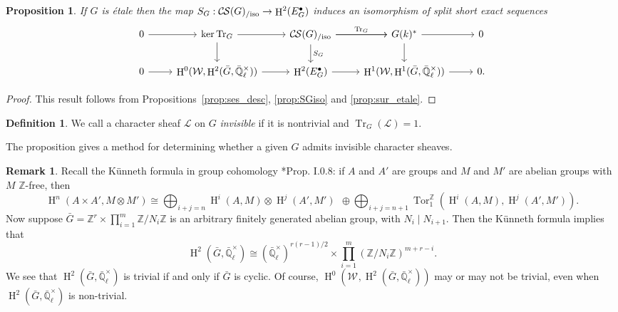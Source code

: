 \documentclass[10pt]{amsart}
\theoremstyle{plain}
\newtheorem{proposition}[theorem]{Proposition}
\theoremstyle{definition}
\newtheorem{definition}[theorem]{Definition}
\newtheorem{remark}[theorem]{Remark}
\newcommand{\ZZ}{{\mathbb{Z}}}
\newcommand{\EE}{\mathbb{\bar Q}_\ell}
\newcommand{\Fq}{k}
\newcommand{\EEx}{\EE^\times}
\newcommand{\Weil}[1]{\mathcal{W}_{#1}}
\DeclareMathOperator{\Hh}{H}
\DeclareMathOperator{\Tor}{Tor}
\newcommand{\TrFrob}[1]{\operatorname{Tr}_{#1}}
\newcommand{\cs}[1]{{\mathcal{#1}}}
\newcommand{\CS}{{\mathcal{C\hskip-0.8pt S}}}
\newcommand{\CSiso}[1]{\CS(#1)_{/\text{iso}}}
\newcommand{\bG}{\bar{G}}
\begin{document}
\begin{proposition} \label{prop:etale-iso}
 If $G$ is \'etale then the map $S_G : \CSiso{G}\to \Hh^2(E^\bullet_G)$ induces an isomorphism of split short exact sequences
\[
\begin{tikzcd}
 0 \arrow{r} & \ker \TrFrob{G} \arrow{d} \arrow{r} & \CSiso{G}\arrow{d}{S_G} \arrow{r}{\TrFrob{G}} \arrow{r} & G(\Fq)^* \arrow{d} \arrow{r} & 0\\
  0 \arrow{r} & \Hh^0(\Weil{},\Hh^2(\bG,\EEx)) \arrow{r} & \Hh^2(E^\bullet_G) \arrow{r} & \Hh^1(\Weil{},\Hh^1(\bG,\EEx)) \arrow{r} & 0.
 \end{tikzcd}
 \]
\end{proposition}
\begin{proof}
This result follows from Propositions~\ref{prop:ses_desc}, \ref{prop:SGiso} and \ref{prop:sur_etale}.
\end{proof}

\begin{definition}
We call a character sheaf $\cs{L}$ on $G$ \emph{invisible} if it is nontrivial and $\TrFrob{G}(\cs{L}) = 1$.
\end{definition}

The proposition gives a method for determining whether a given $G$ admits invisible character sheaves.

\begin{remark} \label{rem:H2}
Recall the K\"unneth formula in group cohomology \cite{brown:CohomologyGrps}*{Prop. I.0.8}:
if $A$ and $A'$ are groups and $M$ and $M'$ are abelian groups with $M$ $\ZZ$-free, then
\[
\Hh^n(A \times A', M \otimes M') \cong \bigoplus_{i+j=n} \Hh^i(A, M) \otimes \Hh^j(A', M') \ \ \oplus
\bigoplus_{i+j=n+1} \Tor_1^{\ZZ}\left(\Hh^i(A, M), \Hh^j(A', M')\right).
\]
%
Now suppose $\bG = \ZZ^r \times \prod_{i = 1}^m \ZZ/N_i\ZZ$ is an arbitrary finitely generated abelian group,
with $N_i \mid N_{i+1}$.  Then the K\"unneth formula implies that
\begin{equation} \label{eq:H2comp}
\Hh^2(\bG, \EEx) \cong \left(\EEx\right)^{r(r-1)/2} \times \prod_{i=1}^m (\ZZ/N_i\ZZ)^{m+r-i}.
\end{equation}
We see that $\Hh^2(\bG, \EEx)$ is trivial if and only if $\bG$ is cyclic.  Of course, $\Hh^0(\Weil{}, \Hh^2(\bG, \EEx))$
may or may not be trivial, even when $\Hh^2(\bG, \EEx)$ is non-trivial.
\end{remark}
\end{document}
